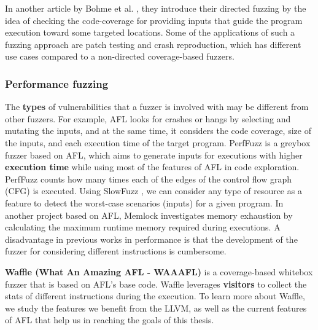 In another article by Bohme et al. \cite{bohme2017directed}, they introduce their directed fuzzing by the idea of checking the code-coverage for providing inputs that guide the program execution toward some targeted locations. Some of the applications of such a fuzzing approach are patch testing and crash reproduction, which has different use cases compared to a non-directed coverage-based fuzzers.

\subsubsection*{Performance fuzzing}

The \textbf{types} of vulnerabilities that a fuzzer is involved with may be different from other fuzzers. For example, AFL looks for crashes or hangs by selecting and mutating the inputs, and at the same time, it considers the code coverage, size of the inputs, and each execution time of the target program. PerfFuzz \cite{lemieux2018perffuzz} is a greybox fuzzer based on AFL, which aims to generate inputs for executions with higher \textbf{execution time} while using most of the features of AFL in code exploration. PerfFuzz counts how many times each of the edges of the control flow graph (CFG) is executed. Using SlowFuzz \cite{petsios2017slowfuzz}, we can consider any type of resource as a feature to detect the worst-case scenarios (inputs) for a given program. In another project based on AFL, Memlock \cite{wen2020memlock} investigates memory exhaustion by calculating the maximum runtime memory required during executions. A disadvantage in previous works in performance is that the development of the fuzzer for considering different instructions is cumbersome.

\vspace{1.5\baselineskip}

\textbf{Waffle (What An Amazing AFL - WAAAFL)} is a coverage-based whitebox fuzzer that is based on AFL's base code. Waffle leverages \textbf{visitors} to collect the stats of different instructions during the execution. To learn more about Waffle, we study the features we benefit from the LLVM, as well as the current features of AFL that help us in reaching the goals of this thesis.